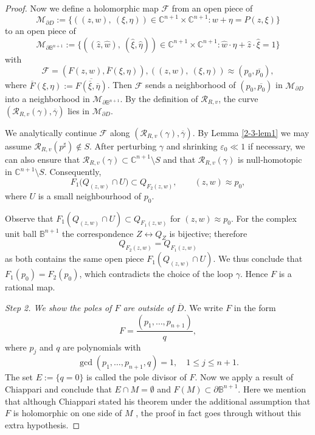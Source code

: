 \documentclass[a4paper,centertags,oneside,12pt]{amsart}
\numberwithin{equation}{section}
\begin{document}
\begin{proof}
Now we define a holomorphic map $\mathcal F$ from an open piece of $$\mathcal M_{\partial D}:=\{((z, w),~(\xi, \eta))\in\mathbb C^{n+1}\times\mathbb C^{n+1}: w+\eta=P(z, \xi)\}$$
    to an open piece of 
    $$\mathcal M_{\partial\mathbb B^{n+1}}:=\{((\widehat z, \widehat w),~ (\widehat\xi, \widehat\eta))\in\mathbb C^{n+1}\times\mathbb C^{n+1}: \widehat w\cdot\widehat \eta+\widehat z\cdot\widehat \xi=1\}$$
    with
    \begin{equation*}
        \mathcal F=(F(z, w), \overline F(\xi, \eta)), ((z, w), ~(\xi, \eta))\approx(p_0, \overline{p_0}),
    \end{equation*}
    where $\overline F(\xi, \eta):=\overline{F(\overline\xi, \overline\eta)}$.
    Then \(\mathcal F\) sends a neighborhood of \((p_0, \overline {p_0})\) in \(\mathcal M_{\partial D}\) into a neighborhood in \(\mathcal M_{\partial \mathbb B^{n+1}}\). By the definition of \(\mathcal R_{R, v}\), the curve
    \((\mathcal R_{R, v}(\gamma),\overline{\gamma})\)
  lies in \(\mathcal M_{\partial D}\).

We  analytically continue \(\mathcal F\) along \((\mathcal R_{R, v}(\gamma), \overline\gamma)\).
By Lemma \ref{2-3-lem1} we may assume \(\mathcal R_{R, v}(p^\sharp)\notin S\). After perturbing \(\gamma\) and shrinking \(\varepsilon_0\ll1\) if necessary, we can also ensure that \(\mathcal R_{R, v}(\gamma) \subset \mathbb C^{n+1}\setminus S\) and that \(\mathcal R_{R, v}(\gamma)\) is null‑homotopic in \(\mathbb C^{n+1}\setminus S\). Consequently,
\[
F_1\bigl(Q_{(z, w)}\cap U\bigr) \subset Q_{F_2(z, w)},\qquad (z,w)\approx p_0,
\]
where \(U\) is a small neighbourhood of \(p_0\).

Observe that \(F_1(Q_{(z, w)}\cap U) \subset Q_{F_1(z, w)}\) for $(z,w)\approx p_0$. For the complex unit ball \(\mathbb B^{n+1}\) the correspondence \(Z \leftrightarrow Q_Z\) is bijective; therefore
\[
Q_{F_2(z, w)} = Q_{F_1(z, w)}
\]
as both contains  the same open piece  \(F_1(Q_{(z, w)}\cap U)\).
We thus conclude that  \(F_1(p_0)=F_2(p_0)\), which contradicts the choice of the loop \(\gamma\). Hence \(F\) is a rational map.

\textit{Step 2. We show the poles of $F$ are outside of $\overline D$.}
We write \(F\) in the form  
\[
F = \frac{(p_1,\dots ,p_{n+1})}{q},
\]
where \(p_j\) and \(q\) are polynomials with
$$\gcd(p_1,\dots ,p_{n+1},q)=1, \quad 1\leq j\leq n+1.$$
The set \(E:=\{q=0\}\) is called the {pole divisor} of \(F\).
Now we apply a result of Chiappari \cite{Ch91} and conclude that $E\cap M=\emptyset$ and $F(M)\subset \partial{\mathbb B}^{n+1}$. Here we mention that although Chiappari \cite{Ch91} stated his theorem under the additional assumption that $F$  is holomorphic on one side of $M$ , the proof in fact goes through without this extra hypothesis.


\end{proof}
\end{document}
